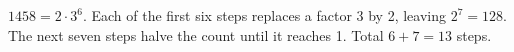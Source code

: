 $1458=2\cdot3^6$. Each of the first six steps replaces a factor 3 by 2, leaving $2^7=128$. The next seven steps halve the count until it reaches 1. Total $6+7=\boxed{13}$ steps.
